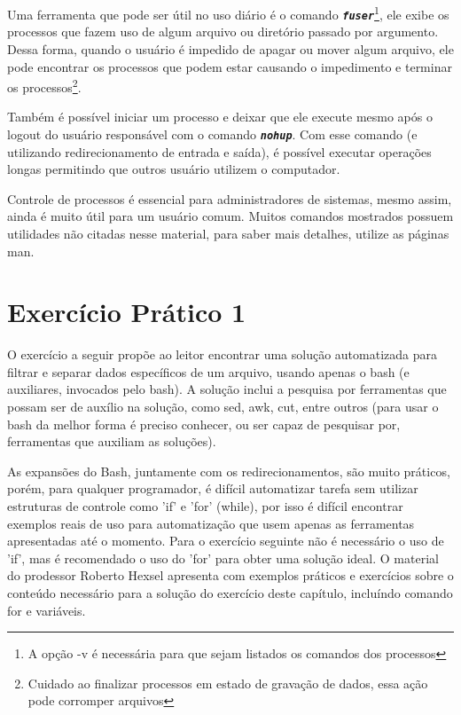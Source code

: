 \documentclass[oneside, 11 pt]{article}
\begin{document}
	Uma ferramenta que pode ser útil no uso diário é o comando \texttt{\textbf{\textit{fuser}}}\footnote{A opção -v é necessária para que sejam listados os comandos dos processos}, ele exibe os processos que fazem uso de algum arquivo ou diretório passado por argumento. Dessa forma, quando o usuário é impedido de apagar ou mover algum arquivo, ele pode encontrar os processos que podem estar causando o impedimento e terminar os processos\footnote{Cuidado ao finalizar processos em estado de gravação de dados, essa ação pode corromper arquivos}.
	
	Também é possível iniciar um processo e deixar que ele execute mesmo após o logout do usuário responsável com o comando \texttt{\textbf{\textit{nohup}}}. Com esse comando (e utilizando redirecionamento de entrada e saída), é possível executar operações longas permitindo que outros usuário utilizem o computador.
	
	Controle de processos é essencial para administradores de sistemas, mesmo assim, ainda é muito útil para um usuário comum. Muitos comandos mostrados possuem utilidades não citadas nesse material, para saber mais detalhes, utilize as páginas man.
	
	\newpage
	\part{Exercício Prático 1}
	
	O exercício a seguir propõe ao leitor encontrar uma solução automatizada para filtrar e separar dados específicos de um arquivo, usando apenas o bash (e auxiliares, invocados pelo bash). A solução inclui a pesquisa por ferramentas que possam ser de auxílio na solução, como sed, awk, cut, entre outros (para usar o bash da melhor forma é preciso conhecer, ou ser capaz de pesquisar por, ferramentas que auxiliam as soluções).

	As expansões do Bash, juntamente com os redirecionamentos, são muito práticos, porém, para qualquer programador, é difícil automatizar tarefa sem utilizar estruturas de controle como 'if' e 'for' (while), por isso é difícil encontrar exemplos reais de uso para automatização que usem apenas as ferramentas apresentadas até o momento. Para o exercício seguinte não é necessário o uso de 'if', mas é recomendado o uso do 'for' para obter uma solução ideal. O material do prodessor Roberto Hexsel \cite{roberto3} apresenta com exemplos práticos e exercícios sobre o conteúdo necessário para a solução do exercício deste capítulo, incluíndo comando for e variáveis.
	
\end{document}
